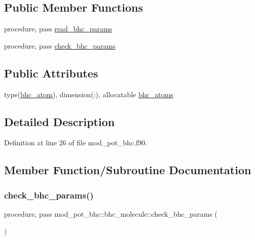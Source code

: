 \subsection*{Public Member Functions}
\begin{DoxyCompactItemize}
\item 
procedure, pass \hyperlink{structmod__pot__bhc_1_1bhc__molecule_a8c2379aa725c1adb422093d53bec6dcf}{read\+\_\+bhc\+\_\+params}
\item 
procedure, pass \hyperlink{structmod__pot__bhc_1_1bhc__molecule_a69e8fd4832bab40ca9a8b25d416b34c5}{check\+\_\+bhc\+\_\+params}
\end{DoxyCompactItemize}
\subsection*{Public Attributes}
\begin{DoxyCompactItemize}
\item 
type(\hyperlink{structmod__pot__bhc_1_1bhc__atom}{bhc\+\_\+atom}), dimension(\+:), allocatable \hyperlink{structmod__pot__bhc_1_1bhc__molecule_a87e3db2ee7f569380cccb2b3ad0bbf15}{bhc\+\_\+atoms}
\end{DoxyCompactItemize}


\subsection{Detailed Description}


Definition at line 26 of file mod\+\_\+pot\+\_\+bhc.\+f90.



\subsection{Member Function/\+Subroutine Documentation}
\mbox{\label{structmod__pot__bhc_1_1bhc__molecule_a69e8fd4832bab40ca9a8b25d416b34c5}} 
\subsubsection{\texorpdfstring{check\+\_\+bhc\+\_\+params()}{check\_bhc\_params()}}
{\footnotesize\ttfamily procedure, pass mod\+\_\+pot\+\_\+bhc\+::bhc\+\_\+molecule\+::check\+\_\+bhc\+\_\+params (\begin{DoxyParamCaption}{ }\end{DoxyParamCaption})}



